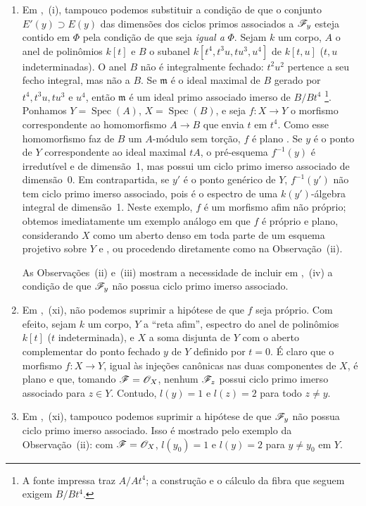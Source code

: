 \begin{remarks}[12.2.3]
\begin{enumerate}[label=(\roman*)]
\item Em ,~(i),
tampouco podemos substituir a
condição de que o conjunto
$E'(y)\supset E(y)$ das
dimensões dos ciclos primos
associados a $\mathscr{F}_y$
esteja contido em $\Phi$
pela condição de que seja
\emph{igual a} $\Phi$. Sejam
$k$ um corpo, $A$ o anel
de polinômios $k[t]$ e $B$
o subanel
$k[t^4,t^3u,tu^3,u^4]$
de $k[t,u]$ ($t,u$
indeterminadas). O anel $B$
não é integralmente fechado:
$t^2u^2$ pertence a seu
fecho integral, mas não a
$B$. Se $\mathfrak m$ é o
ideal maximal de $B$
gerado por $t^4,t^3u,tu^3$
e $u^4$, então $\mathfrak m$
é um ideal primo associado
imerso de $B/Bt^4$%
\footnote{A fonte impressa
traz $A/At^4$; a construção
e o cálculo da fibra que
seguem exigem $B/Bt^4$.}.
Ponhamos
$Y=\operatorname{Spec}(A)$,
$X=\operatorname{Spec}(B)$,
e seja $f:X\to Y$ o
morfismo correspondente ao
homomorfismo $A\to B$ que
envia $t$ em $t^4$. Como
esse homomorfismo faz de
$B$ um $A$-módulo sem
torção, $f$ é plano
. Se $y$
é o ponto de $Y$
correspondente ao ideal
maximal $tA$, o pré-esquema
$f^{-1}(y)$ é irredutível
e de dimensão~1, mas possui
um ciclo primo imerso
associado de dimensão~0.
Em contrapartida, se $y'$
é o ponto genérico de $Y$,
$f^{-1}(y')$ não tem ciclo
primo imerso associado,
pois é o espectro de uma
$k(y')$-álgebra integral
de dimensão~1. Neste
exemplo, $f$ é um
morfismo afim não próprio;
obtemos imediatamente um
exemplo análogo em que $f$
é próprio e plano,
considerando $X$ como
um aberto denso em toda
parte de um esquema
projetivo sobre $Y$
 e
,
ou procedendo diretamente
como na Observação~(ii).

As Observações~(ii) e~(iii)
mostram a necessidade de
incluir em
,~(iv)
a condição de que
$\mathscr{F}_y$ não possua
ciclo primo imerso
associado.

\item Em ,~(xi),
não podemos suprimir a hipótese
de que $f$ seja próprio.
Com efeito, sejam $k$ um corpo,
$Y$ a “reta afim”, espectro
do anel de polinômios $k[t]$
($t$ indeterminada), e $X$
a soma disjunta de $Y$ com
o aberto complementar do
ponto fechado $y$ de $Y$
definido por $t=0$. É claro
que o morfismo $f:X\to Y$,
igual às injeções canônicas
nas duas componentes de $X$,
é plano e que, tomando
$\mathscr{F}=\mathscr{O}_X$, nenhum
$\mathscr{F}_z$ possui ciclo
primo imerso associado
para $z\in Y$. Contudo,
$l(y)=1$ e $l(z)=2$
para todo $z\ne y$.

\item Em ,~(xi),
tampouco podemos suprimir a
hipótese de que $\mathscr{F}_y$
não possua ciclo primo
imerso associado. Isso
é mostrado pelo exemplo
da Observação~(ii): com
$\mathscr{F}=\mathscr{O}_X$,
$l(y_0)=1$ e $l(y)=2$
para $y\ne y_0$ em $Y$.


\end{enumerate}
\end{remarks}
